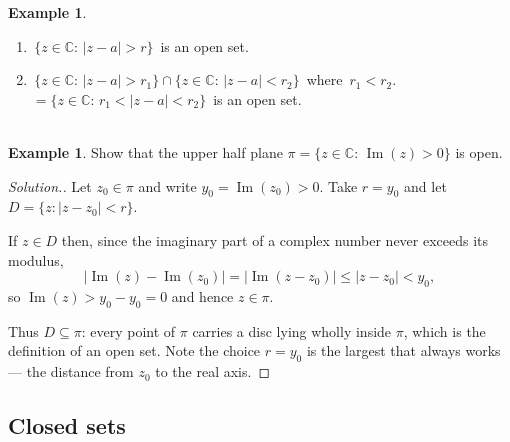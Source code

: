 \documentclass[11pt,a4paper]{article}
\theoremstyle{definition}
\newtheorem{example}[thm]{Example}
\newenvironment{solution}
  {\renewcommand{\qedsymbol}{}\begin{proof}[\textit{Solution}.]}
  {\end{proof}}
\begin{document}
\begin{example}
\begin{enumerate}
\item $\, \big\{z \in \mathbb{C}:\, \left|z - a\right| > r\big\}\,$ is an open set.

\item $\, \big\{z \in \mathbb{C}:\, \left|z - a\right| > r_1\big\} \cap  \big\{z \in \mathbb{C}:\, \left|z - a\right| < r_2\big\}\,$ where $\, r_1 < r_2$.\\





















$= \big\{z \in \mathbb{C}:\,r_1 < \left|z - a\right| < r_2\big\}\,$ is an open set.\\\\
\end{enumerate}





\begin{example}
Show that the upper half plane
$\pi = \big\{ z \in \mathbb{C}:\, \operatorname{Im}(z) > 0\big\}$ is open.
\end{example}
\begin{solution}
Let $z_0\in\pi$ and write $y_0=\operatorname{Im}(z_0)>0$. Take $r=y_0$ and let
$D=\{z:\left|z-z_0\right|<r\}$.

If $z\in D$ then, since the imaginary part of a complex number never exceeds
its modulus,
$$\left|\operatorname{Im}(z)-\operatorname{Im}(z_0)\right|
=\left|\operatorname{Im}(z-z_0)\right|\leq \left|z-z_0\right|<y_0 ,$$
so $\operatorname{Im}(z)>y_0-y_0=0$ and hence $z\in\pi$.

Thus $D\subseteq\pi$: every point of $\pi$ carries a disc lying wholly inside
$\pi$, which is the definition of an open set. Note the choice $r=y_0$ is the
largest that always works --- the distance from $z_0$ to the real axis.
\end{solution}
\end{example}

{\color[wave]{485}\subsection{Closed sets}}
\end{document}

